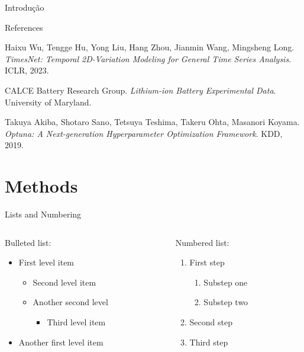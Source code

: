 \begin{frame}{Introdução}
\begin{frame}
\begin{frame}{References}
  \begin{thebibliography}{9}
      Haixu Wu, Tengge Hu, Yong Liu, Hang Zhou, Jianmin Wang, Mingsheng Long.
      \emph{TimesNet: Temporal 2D-Variation Modeling for General Time Series Analysis}.
      ICLR, 2023.
    
      CALCE Battery Research Group.
      \emph{Lithium-ion Battery Experimental Data}.
      University of Maryland.
      
      Takuya Akiba, Shotaro Sano, Tetsuya Teshima, Takeru Ohta, Masanori Koyama.
      \emph{Optuna: A Next-generation Hyperparameter Optimization Framework}.
      KDD, 2019.
  \end{thebibliography}
\end{frame}



\section{Methods}
\begin{frame}{Lists and Numbering}
  \begin{columns}
    \begin{column}{0.48\textwidth}
      Bulleted list:
      \begin{itemize}
        \item First level item
        \begin{itemize}
          \item Second level item
          \item Another second level
          \begin{itemize}
            \item Third level item
          \end{itemize}
        \end{itemize}
        \item Another first level item
      \end{itemize}
    \end{column}
    \begin{column}{0.48\textwidth}
      Numbered list:
      \begin{enumerate}
        \item First step
        \begin{enumerate}
          \item Substep one
          \item Substep two
        \end{enumerate}
        \item Second step
        \item Third step
      \end{enumerate}
    \end{column}
  \end{columns}
\end{frame}


\end{frame}
\end{frame}
